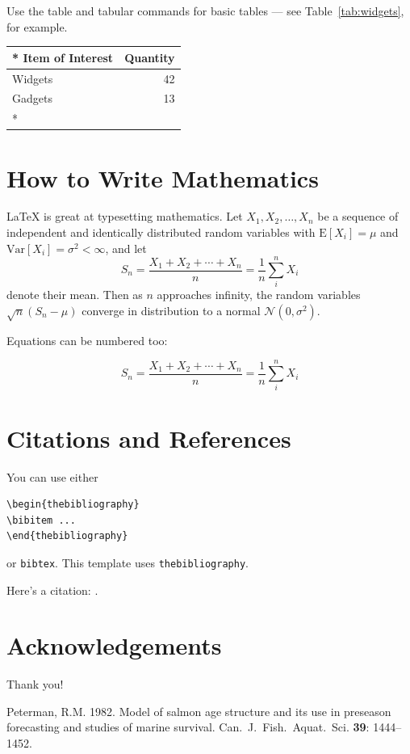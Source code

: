 \documentclass{nrc2}
\begin{document}
Use the table and tabular commands for basic tables --- see Table~\ref{tab:widgets}, for example.

\begin{table}[hbt!]
\centering
\begin{tabular}{l|r}
\hline*    %
Item of Interest & Quantity \\\hline
Widgets & 42 \\
Gadgets & 13\\
\hline*    %
\end{tabular}
\end{table}

\section{How to Write Mathematics}

\LaTeX{} is great at typesetting mathematics. Let $X_1, X_2, \ldots, X_n$ be a sequence of independent and identically distributed random variables with $\text{E}[X_i] = \mu$ and $\text{Var}[X_i] = \sigma^2 < \infty$, and let
$$S_n = \frac{X_1 + X_2 + \cdots + X_n}{n}
      = \frac{1}{n}\sum_{i}^{n} X_i$$
denote their mean. Then as $n$ approaches infinity, the random variables $\sqrt{n}(S_n - \mu)$ converge in distribution to a normal $\mathcal{N}(0, \sigma^2)$.

Equations can be numbered too:

\begin{equation}
S_n = \frac{X_1 + X_2 + \cdots + X_n}{n}
      = \frac{1}{n}\sum_{i}^{n} X_i
\end{equation}

\section{Citations and References}
You can use either

\begin{verbatim}
\begin{thebibliography}
\bibitem ...
\end{thebibliography}
\end{verbatim}
%
or \verb|bibtex|. This template uses \texttt{thebibliography}.

Here's a citation:
\citep{peterman1982}.

\section*{Acknowledgements}
Thank you!

\begin{thebibliography}{}
Peterman, R.M. 1982. Model of salmon age structure and its use in  preseason forecasting and studies of marine  survival. Can.~J.~Fish.~Aquat.~Sci.
\textbf{39}: 1444--1452.
\end{thebibliography}
\end{document}
